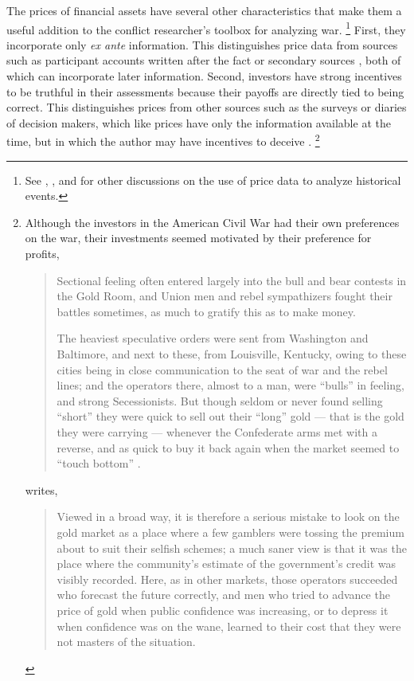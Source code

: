 The prices of financial assets have several other characteristics that make them a useful addition to the conflict researcher's toolbox for analyzing war.
\footnote{See \textcite{WillardGuinnaneEtAl1996}, \textcite{north2000introd}, and \textcite{FreyKucher2000} for other  discussions on the use of price data to analyze historical events.} %
First, they incorporate only \textit{ex ante} information.
This distinguishes price data from sources such as participant accounts written after the fact or secondary sources \parencites[1001]{WillardGuinnaneEtAl1996}[][188]{FreyKucher2000a}, both of which can incorporate later information.
Second, investors have strong incentives to be truthful in their assessments because their payoffs are directly tied to being correct.
This distinguishes prices from other sources such as the surveys or diaries of decision makers, which like prices have only the information available at the time, but in which the author may have incentives to deceive \parencite[57]{Reiter2009}.%
\footnote{
  Although the investors in the American Civil War had their own preferences on the war, their investments seemed motivated by their preference for profits,
  \begin{quote}
    Sectional feeling often entered largely into the bull and bear  contests in the Gold Room, and Union men and rebel sympathizers fought their battles sometimes, as much to gratify this as to make money.
    \textcite[7]{Cornwallis1879}

    The heaviest speculative orders were sent from Washington and Baltimore, and next to these, from Louisville, Kentucky, owing to these cities being in close communication to the seat of war and the rebel lines; and the operators there, almost to a man, were ``bulls'' in feeling, and strong Secessionists.
    But though seldom or never found selling ``short'' they were quick to sell out their ``long'' gold --- that is the gold they were carrying --- whenever the Confederate arms met with a reverse, and as quick to buy it back again when the market seemed to ``touch bottom'' \textcite[5]{Cornwallis1879}.
  \end{quote}
  \textcite[210]{Mitchell1903} writes,
  \begin{quote}
    Viewed in a broad way, it is therefore a serious mistake to look on the gold market as a place where a few gamblers were tossing the premium about to suit their selfish schemes; a much saner view is that it was the place where the community's estimate of the government's credit was visibly recorded.
    Here, as in other markets, those operators succeeded who forecast the future correctly, and men who tried to advance the price of gold when public confidence was increasing, or to depress it when confidence was on the wane, learned to their cost that they were not masters of the situation.
  \end{quote}
} %
